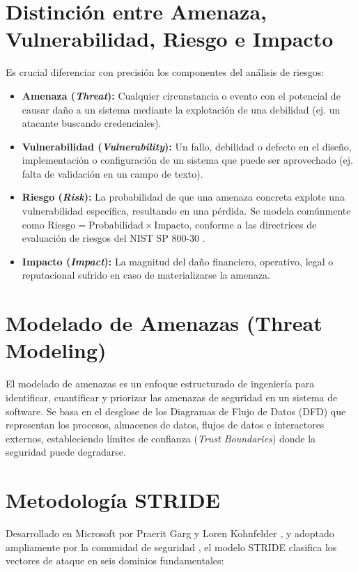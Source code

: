 \section{Distinción entre Amenaza, Vulnerabilidad, Riesgo e Impacto}
Es crucial diferenciar con precisión los componentes del análisis de riesgos:
\begin{itemize}
    \item \textbf{Amenaza (\textit{Threat}):} Cualquier circunstancia o evento con el potencial de causar daño a un sistema mediante la explotación de una debilidad (ej. un atacante buscando credenciales).
    \item \textbf{Vulnerabilidad (\textit{Vulnerability}):} Un fallo, debilidad o defecto en el diseño, implementación o configuración de un sistema que puede ser aprovechado (ej. falta de validación en un campo de texto).
    \item \textbf{Riesgo (\textit{Risk}):} La probabilidad de que una amenaza concreta explote una vulnerabilidad específica, resultando en una pérdida. Se modela comúnmente como $\text{Riesgo} = \text{Probabilidad} \times \text{Impacto}$, conforme a las directrices de evaluación de riesgos del NIST SP 800-30 \citep{nist2012sp80030}.
    \item \textbf{Impacto (\textit{Impact}):} La magnitud del daño financiero, operativo, legal o reputacional sufrido en caso de materializarse la amenaza.
\end{itemize}

\section{Modelado de Amenazas (Threat Modeling)}
El modelado de amenazas es un enfoque estructurado de ingeniería para identificar, cuantificar y priorizar las amenazas de seguridad en un sistema de software. Se basa en el desglose de los Diagramas de Flujo de Datos (DFD) que representan los procesos, almacenes de datos, flujos de datos e interactores externos, estableciendo límites de confianza (\textit{Trust Boundaries}) donde la seguridad puede degradarse.

\section{Metodología STRIDE}
Desarrollado en Microsoft por Praerit Garg y Loren Kohnfelder \citep{kohnfelder1999threats,shostack2014threat}, y adoptado ampliamente por la comunidad de seguridad \citep{owasp2020threatmodeling}, el modelo STRIDE clasifica los vectores de ataque en seis dominios fundamentales:

